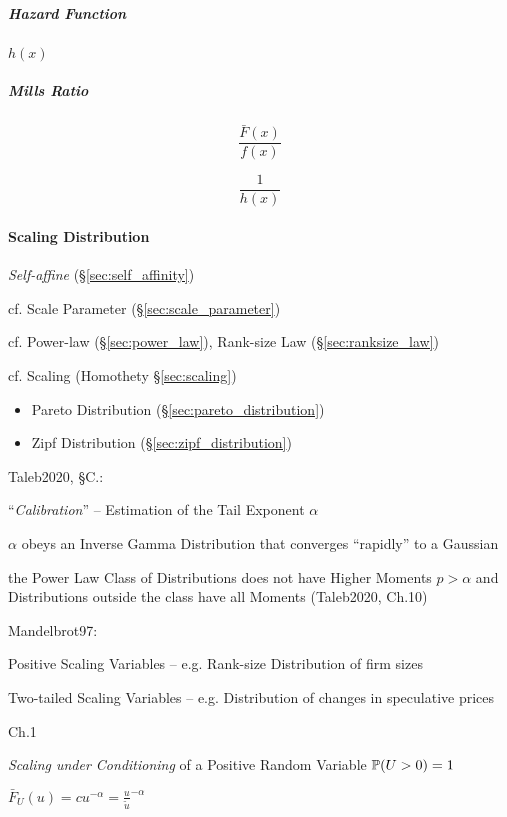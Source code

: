 \subparagraph{Hazard Function}\label{sec:hazard_function}\hfill

$h(x)$



\subparagraph{Mills Ratio}\label{sec:mills_ratio}\hfill

\[
  \frac{\bar{F}(x)}{f(x)}
\]

\[
  \frac{1}{h(x)}
\]



\paragraph{Scaling Distribution}\label{sec:scaling_distribution}\hfill

\emph{Self-affine} (\S\ref{sec:self_affinity})

cf. Scale Parameter (\S\ref{sec:scale_parameter})

cf. Power-law (\S\ref{sec:power_law}), Rank-size Law (\S\ref{sec:ranksize_law})

cf. Scaling (Homothety \S\ref{sec:scaling})


\begin{itemize}
  \item Pareto Distribution (\S\ref{sec:pareto_distribution})
  \item Zipf Distribution (\S\ref{sec:zipf_distribution})
\end{itemize}

Taleb2020, \S C.:

``\emph{Calibration}'' -- Estimation of the Tail Exponent $\alpha$

$\alpha$ obeys an Inverse Gamma Distribution that converges ``rapidly'' to a
Gaussian

the Power Law Class of Distributions does not have Higher Moments $p > \alpha$
and Distributions outside the class have all Moments (Taleb2020, Ch.10)

Mandelbrot97:

Positive Scaling Variables -- e.g. Rank-size Distribution of firm sizes

Two-tailed Scaling Variables -- e.g. Distribution of changes in speculative
prices

Ch.1

\emph{Scaling under Conditioning} of a Positive Random Variable
$\mathbb{P}(U > 0) = 1$

$\bar{F}_U(u) = c u^{-\alpha} = \frac{u}{\tilde{u}}^{-\alpha}$

